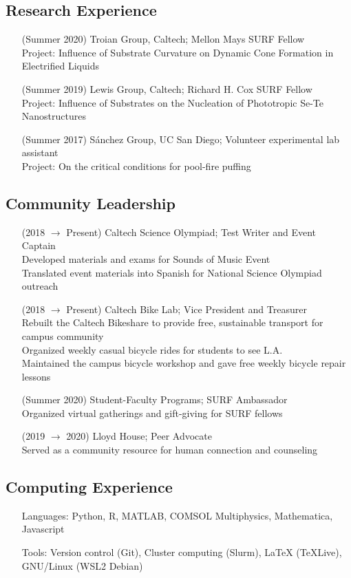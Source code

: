 \documentclass{article}
\begin{document}
\nocite{*}
\printbibliography[title={Publications}, heading=subbibliography]


\subsection*{Research Experience}

\begin{enumerate}
    \item [(Summer 2020)] Troian Group, Caltech; Mellon Mays SURF Fellow \\
        Project: Influence of Substrate Curvature on Dynamic Cone Formation in Electrified Liquids
    \item [(Summer 2019)] Lewis Group, Caltech; Richard H. Cox SURF Fellow \\
        Project: Influence of Substrates on the Nucleation of Phototropic Se-Te Nanostructures
    \item [(Summer 2017)] Sánchez Group, UC San Diego; Volunteer experimental lab assistant \\
        Project: On the critical conditions for pool-fire puffing
\end{enumerate}


\subsection*{Community Leadership}

\begin{enumerate}
    \item [(2018 $\to$ Present)] Caltech Science Olympiad; Test Writer and Event Captain \\
        Developed materials and exams for Sounds of Music Event \\
        Translated event materials into Spanish for National Science Olympiad outreach
    \item [(2018 $\to$ Present)] Caltech Bike Lab; Vice President and Treasurer \\
        Rebuilt the Caltech Bikeshare to provide free, sustainable transport for campus community \\
        Organized weekly casual bicycle rides for students to see L.A. \\
        Maintained the campus bicycle workshop and gave free weekly bicycle repair lessons
    \item [(Summer 2020)] Student-Faculty Programs; SURF Ambassador \\
        Organized virtual gatherings and gift-giving for SURF fellows
    \item [(2019 $\to$ 2020)] Lloyd House; Peer Advocate \\
        Served as a community resource for human connection and counseling
\end{enumerate}


\subsection*{Computing Experience}

\begin{enumerate}
	\item [Languages:] Python, R, MATLAB, COMSOL Multiphysics, Mathematica, Javascript
	\item [Tools:] Version control (Git), Cluster computing (Slurm), LaTeX (TeXLive), GNU/Linux (WSL2 Debian)
\end{enumerate}
\end{document}
